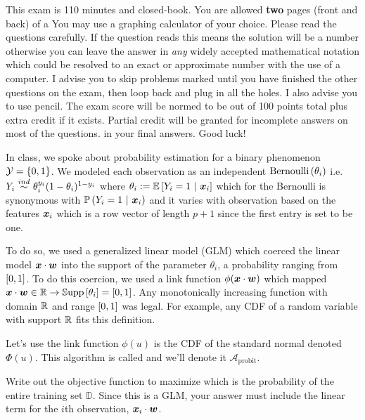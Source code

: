 \documentclass[12pt]{article}
\begin{document}
This exam is 110 minutes and closed-book. You are allowed \textbf{two} pages (front and back) of a  You may use a graphing calculator of your choice. Please read the questions carefully. If the question reads  this means the solution will be a number otherwise you can leave the answer in \textit{any} widely accepted mathematical notation which could be resolved to an exact or approximate number with the use of a computer. I advise you to skip problems marked  until you have finished the other questions on the exam, then loop back and plug in all the holes. I also advise you to use pencil. The exam score will be normed to be out of 100 points total plus extra credit if it exists. Partial credit will be granted for incomplete answers on most of the questions.  in your final answers. Good luck!

\pagebreak

\problem In class, we spoke about probability estimation for a binary phenomenon $\mathcal{Y} = \left\{0,1\right\}$. We modeled each observation as an independent $\mathrm{Bernoulli}\left(\theta_i\right)$ i.e. $Y_i \inddist  \theta_i^{y_i} (1 - \theta_i)^{1-y_i}$ where $\theta_i := \mathbb{E}\left[Y_i = 1~|~\boldsymbol{x}_i\right]$ which for the Bernoulli is synonymous with $\mathbb{P}\left(Y_i = 1~|~\boldsymbol{x}_i\right)$ and it varies with observation based on the features $\boldsymbol{x}_i$ which is a row vector of length $p+1$ since the first entry is set to be one. 

To do so, we used a generalized linear model (GLM) which coerced the linear model $\boldsymbol{x} \cdot \boldsymbol{w}$ into the support of the parameter $\theta_i$, a probability ranging from $\left[0,1\right]$. To do this coercion, we used a link function $\phi(\boldsymbol{x} \cdot \boldsymbol{w})$ which mapped $\boldsymbol{x} \cdot \boldsymbol{w} \in \mathbb{R} \rightarrow \mathbb{S}\text{upp}\left[\theta_i\right] = \left[0,1\right]$. Any monotonically increasing function with domain $\mathbb{R}$ and range $\left[0,1\right]$ was legal. For example, any CDF of a random variable with support $\mathbb{R}$ fits this definition. 

Let's use the link function $\phi(u)$ is the CDF of the standard normal denoted $\Phi(u)$. This algorithm is called  and we'll denote it $\mathcal{A}_{\text{probit}}$.

\benum
{} Write out the objective function to maximize which is the probability of the entire training set $\mathbb{D}$. Since this is a GLM, your answer must include the linear term for the $i$th observation, $\boldsymbol{x}_i \cdot \boldsymbol{w}$. \\
\end{document}
